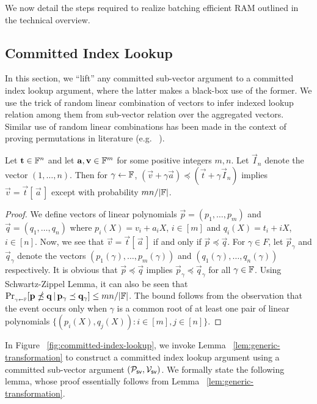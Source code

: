 We now detail the steps required to realize batching efficient RAM outlined in the technical overview.

\subsection{Committed Index Lookup}\label{subsec:committed-index-lookup}
In this section, we ``lift'' any committed sub-vector argument to a committed index lookup argument, where
the latter makes a black-box use of the former. We use the trick of random linear combination of vectors to infer
indexed lookup relation among them from sub-vector relation over the aggregated vectors. Similar use of random
 linear combinations has been made in the context of proving permutations in literature (e.g. ~\cite{SCN:GOTV22}).

\begin{lemma}\label{lem:generic-transformation}
Let $\mathbf{t}\in \mathbb{F}^n$ and let $\mathbf{a},\mathbf{v}\in \mathbb{F}^m$ for some positive integers $m,n$. Let $\vec{I}_n$ denote the vector $(1,\ldots,n)$.
Then for $\gamma\gets \mathbb{F}$, $(\vec{v}+\gamma \vec{a})\preceq (\vec{t} + \gamma \vec{I}_n)$ implies
$\vec{v}=\vec{t}[\,\vec{a}\,]$ except with probability $mn/|\mathbb{F}|$.
\end{lemma}
\begin{proof}
We define vectors of linear polynomials $\vec{p}=(p_1,\ldots,p_m)$ and $\vec{q}=(q_1,\ldots,q_n)$ where
$p_i(X) = v_i + a_i X$, $i\in [m]$ and $q_i(X) = t_i + i X$, $i\in [n]$. Now, we see that $\vec{v}=\vec{t}[\,\vec{a}\,]$
if and only if $\vec{p}\preceq \vec{q}$. For $\gamma\in F$, let $\vec{p}_\gamma$ and $\vec{q}_\gamma$ denote the vectors
$(p_1(\gamma),\ldots,p_m(\gamma))$ and $(q_1(\gamma),\ldots,q_n(\gamma))$ respectively. It is obvious that $\vec{p}\preceq \vec{q}$
implies $\vec{p}_\gamma\preceq \vec{q}_\gamma$ for all $\gamma\in \mathbb{F}$. Using Schwartz-Zippel Lemma, it can also be seen that
$\Pr_{{}_{\gamma\gets \mathbb{F}}}[\mathbf{p}\npreceq \mathbf{q} \,|\, \mathbf{p}_\gamma\preceq \mathbf{q}_\gamma]\leq mn/|\mathbb{F}|$. The bound
follows from the observation that the event occurs only when $\gamma$ is a common root of at least one pair of linear polynomials
$\{(p_i(X),q_j(X)): i\in [m], j\in [n]\}$.
\end{proof}
In Figure ~\ref{fig:committed-index-lookup}, we invoke Lemma ~\ref{lem:generic-transformation} to construct a
committed index lookup argument using a committed sub-vector argument $(\mathcal{P}_{\mathsf{sv}},\mathcal{V}_{\mathsf{sv}})$. We formally
state the following lemma, whose proof essentially follows from Lemma ~\ref{lem:generic-transformation}.

